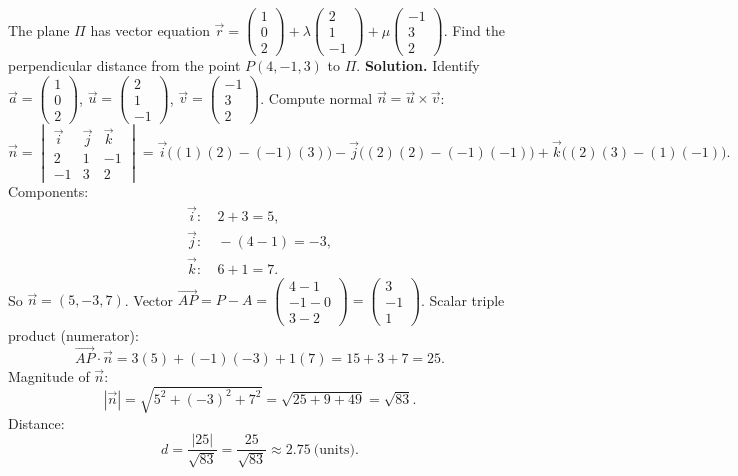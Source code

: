 \documentclass[11pt]{article}
\begin{document}
\begin{exoresolu}
The plane $\Pi$ has vector equation $\vec{r}=\begin{pmatrix}1\\0\\2\end{pmatrix}+\lambda\begin{pmatrix}2\\1\\-1\end{pmatrix}+\mu\begin{pmatrix}-1\\3\\2\end{pmatrix}$.
Find the perpendicular distance from the point $P(4,-1,3)$ to $\Pi$.
\tcblower
\textbf{Solution.}
Identify $\vec{a}=\begin{pmatrix}1\\0\\2\end{pmatrix}$, $\vec{u}=\begin{pmatrix}2\\1\\-1\end{pmatrix}$, $\vec{v}=\begin{pmatrix}-1\\3\\2\end{pmatrix}$.
Compute normal $\vec{n}=\vec{u}\times\vec{v}$:
\[
\vec{n}=
\begin{vmatrix}
\vec{i} & \vec{j} & \vec{k} \\
2 & 1 & -1 \\
-1 & 3 & 2
\end{vmatrix}
=\vec{i}\bigl((1)(2)-(-1)(3)\bigr)-\vec{j}\bigl((2)(2)-(-1)(-1)\bigr)+\vec{k}\bigl((2)(3)-(1)(-1)\bigr).
\]
Components:
\begin{align*}
\vec{i}:&\ 2+3=5,\\
\vec{j}:&\ -(4-1)=-3,\\
\vec{k}:&\ 6+1=7.
\end{align*}
So $\vec{n}=(5,-3,7)$.
Vector $\overrightarrow{AP}=P-A=\begin{pmatrix}4-1\\-1-0\\3-2\end{pmatrix}=\begin{pmatrix}3\\-1\\1\end{pmatrix}$.
Scalar triple product (numerator):
\[
\overrightarrow{AP}\cdot\vec{n}=3(5)+(-1)(-3)+1(7)=15+3+7=25.
\]
Magnitude of $\vec{n}$:
\[
|\vec{n}|=\sqrt{5^2+(-3)^2+7^2}=\sqrt{25+9+49}=\sqrt{83}.
\]
Distance:
\[
d=\frac{|25|}{\sqrt{83}}=\frac{25}{\sqrt{83}}\approx 2.75\ \text{(units)}.
\]
\end{exoresolu}
\end{document}
